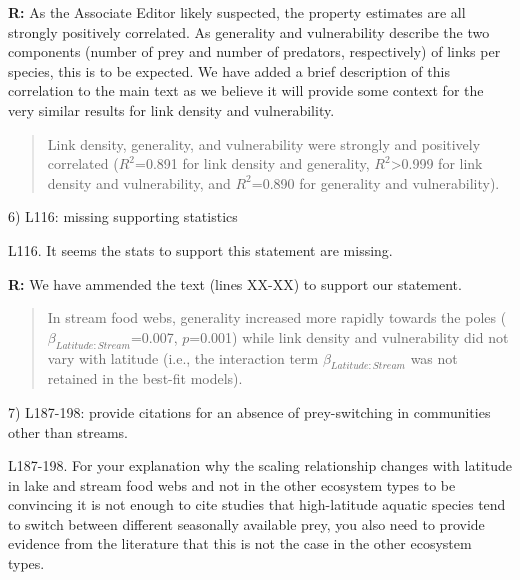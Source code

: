 \documentclass[12pt]{letter}
\newenvironment{refquote}{\bigskip \begin{it}}{\end{it}\smallskip}
\begin{document}
  \textbf{R:} As the Associate Editor likely suspected, the property estimates
  are all strongly    positively correlated. As generality and vulnerability
  describe the two components (number of prey and number    of predators,
  respectively) of links per species, this is   to be expected. We have added a
  brief description of this correlation to the main text as we believe it   will
  provide some context for the very similar results for link density and
  vulnerability.

  \begin{quotation}

    Link density, generality, and vulnerability were strongly and positively
    correlated ($R^2$=0.891 for link density and generality,
    $R^2$\textgreater0.999 for link density and vulnerability, and $R^2$=0.890
    for generality and vulnerability).

  \end{quotation}


  6) L116: missing supporting statistics

  \begin{refquote}

    L116. It seems the stats to support this statement are missing.

  \end{refquote}
 

  \textbf{R:} We have ammended the text (lines XX-XX) to support our statement.

  \begin{quotation}
    In stream food
    webs, generality increased more rapidly towards the poles
    ($\beta_{Latitude:Stream}$=0.007, $p$=0.001) while link density and
    vulnerability did not vary with latitude (i.e., the interaction term $\beta_{Latitude:Stream}$ was not retained in the best-fit models).
  \end{quotation}


  7) L187-198: provide citations for an absence of prey-switching in communities other than streams.

  \begin{refquote}

    L187-198. For your explanation why the scaling relationship changes with
    latitude in lake and stream food webs and not in the other ecosystem types
    to be convincing it is not enough to cite studies that high-latitude
    aquatic species tend to switch between different seasonally available
    prey, you also need to provide evidence from the literature that this is
    not the case in the other ecosystem types.

  \end{refquote}
\end{document}
